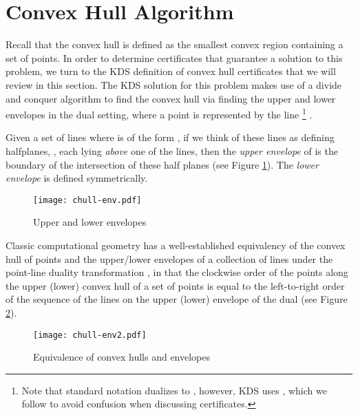 \documentclass[11pt]{article}
\begin{document}
 
\section{Convex Hull Algorithm}
\label{convex_hull}
Recall that the convex hull is defined as the smallest convex region
containing a set of points.  In order to determine certificates that
guarantee a solution to this problem, we turn to the KDS definition of
convex hull certificates \cite{Basch99MobileData} that we will review in this section.  The KDS solution for this problem makes use
of a divide and conquer algorithm to find the convex hull via finding the 
upper and lower envelopes in the
dual setting, where a point  is represented by the line  \footnote{Note that standard notation dualizes  to , 
however, KDS \cite{Basch99MobileData} uses , which we follow to avoid confusion when discussing certificates.}
\cite{Basch99MobileData, ORourke1998book}.  

Given a set of  lines  where  is of the form
, if we think of these
lines as defining  halfplanes, , each lying \emph{above}
one of the lines, then the \emph{upper envelope} of  is the boundary of the intersection of these half planes (see Figure \ref{fig:envelope}). The \emph{lower envelope} is defined symmetrically.
\begin{figure}[H]
\begin{center}
\texttt{[image: chull-env.pdf]}
\caption{Upper and lower envelopes}
\label{fig:envelope}
\vspace{-0.2in}
\end{center}
\end{figure}

Classic computational geometry has a well-established equivalency of the
convex hull of points and the upper/lower envelopes of a collection of lines
under the point-line duality transformation \cite{Basch99MobileData, ORourke1998book}, in that the clockwise order of the points along the upper (lower) convex hull of a set of points  is equal to the left-to-right order of the sequence of the lines on the upper (lower) envelope of the dual  (see Figure \ref{fig:chull-env}). 

\begin{figure}[H]
\begin{center}
\texttt{[image: chull-env2.pdf]}
\caption{Equivalence of convex hulls and envelopes}
\label{fig:chull-env}
\end{center}
\end{figure}
\end{document}
